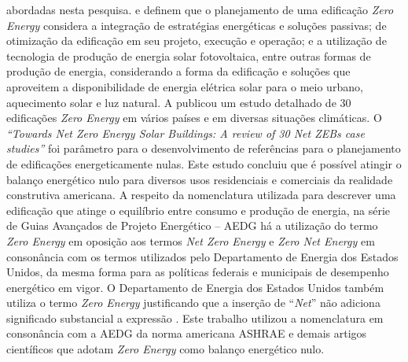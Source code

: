 abordadas nesta pesquisa.\newline
\textcite{Didone2014} e \textcite{Athienitis2015} definem que o planejamento de 
uma edificação \textit{Zero Energy} considera a integração de estratégias energéticas 
e soluções passivas; de otimização da edificação em seu projeto, execução e 
operação; e a utilização de tecnologia de produção de energia solar 
fotovoltaica, entre outras formas de produção de energia, considerando a 
forma da edificação e soluções que aproveitem a disponibilidade de energia 
elétrica solar para o meio urbano, aquecimento solar e luz natural.\newline
A \textcite{InternationalEnergyAgency-IEA2014} publicou um estudo detalhado de 
30 edificações \textit{Zero Energy} em vários países e em diversas situações climáticas. 
O \textit{“Towards Net Zero Energy Solar Buildings: A review of 30 Net ZEBs case studies”} 
foi parâmetro para o desenvolvimento de referências para o planejamento de edificações 
energeticamente nulas. Este estudo concluiu que é possível atingir o balanço energético 
nulo para diversos usos residenciais e comerciais da realidade construtiva americana.\newline
A respeito da nomenclatura utilizada para descrever uma edificação que atinge 
o equilíbrio entre consumo e produção de energia, na série de Guias Avançados de Projeto 
Energético – AEDG \cite{AmericanSocietyofHeatingRefrigeratingandAir-ConditioningEngineers-ASHRAE2019} 
há a utilização do termo \textit{Zero Energy} em oposição aos termos \textit{Net Zero Energy} 
e \textit{Zero Net Energy} em consonância com os termos utilizados pelo Departamento 
de Energia dos Estados Unidos, da mesma forma para as políticas federais e municipais 
de desempenho energético em vigor. O Departamento de Energia dos Estados Unidos também 
utiliza o termo \textit{Zero Energy} justificando que a inserção de “\textit{Net}” não 
adiciona significado substancial a expressão \cite{U.S.DepartmentofEnergy-USDOE2015a}. 
Este trabalho utilizou a nomenclatura em consonância com a AEDG da norma americana ASHRAE 
e demais artigos científicos que adotam \textit{Zero Energy} como balanço energético nulo.

